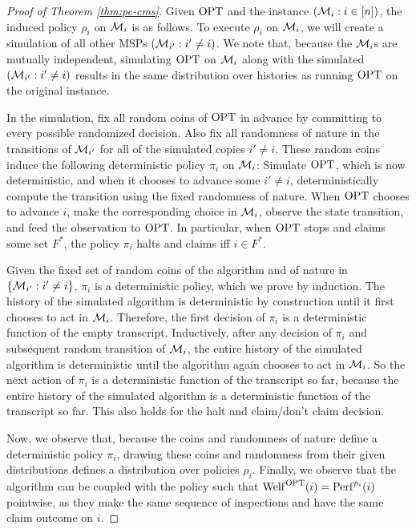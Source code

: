 \begin{proof}[Proof of Theorem \ref{thm:pc-cms}]
  Given $\mathrm{OPT}$ and the instance $(\mathcal{M}_i : i \in [n])$, the induced policy $\rho_i$ on $\mathcal{M}_i$ is as follows.
  To execute $\rho_i$ on $\mathcal{M}_i$, we will create a simulation of all other MSPs $(\mathcal{M}_{i'} : i' \neq i)$.
  We note that, because the $\mathcal{M}_i$s are mutually independent, simulating $\mathrm{OPT}$ on $\mathcal{M}_i$ along with the simulated $(\mathcal{M}_{i'} : i' \neq i)$ results in the same distribution over histories as running $\mathrm{OPT}$ on the original instance.

  In the simulation, fix all random coins of $\mathrm{OPT}$ in advance by committing to every possible randomized decision.
  Also fix all randomness of nature in the transitions of $\mathcal{M}_{i'}$ for all of the simulated copies $i' \neq i$.
  These random coins induce the following deterministic policy $\pi_i$ on $\mathcal{M}_i$:
  Simulate $\mathrm{OPT}$, which is now deterministic, and when it chooses to advance some $i' \neq i$, deterministically compute the transition using the fixed randomness of nature.
  When $\mathrm{OPT}$ chooses to advance $i$, make the corresponding choice in $\mathcal{M}_i$, observe the state transition, and feed the observation to $\mathrm{OPT}$.
  In particular, when $\mathrm{OPT}$ stops and claims some set $F^*$, the policy $\pi_i$ halts and claims iff $i \in F^*$.

  Given the fixed set of random coins of the algorithm and of nature in $\{\mathcal{M}_{i'} : i' \neq i\}$, $\pi_i$ is a deterministic policy, which we prove by induction.
  The history of the simulated algorithm is deterministic by construction until it first chooses to act in $\mathcal{M}_i$.
  Therefore, the first decision of $\pi_i$ is a deterministic function of the empty transcript.
  Inductively, after any decision of $\pi_i$ and subsequent random transition of $\mathcal{M}_i$, the entire history of the simulated algorithm is deterministic until the algorithm again chooses to act in $\mathcal{M}_i$.
  So the next action of $\pi_i$ is a deterministic function of the transcript so far, because the entire history of the simulated algorithm is a deterministic function of the transcript so far.
  This also holds for the halt and claim/don't claim decision.
	

  Now, we observe that, because the coins and randomness of nature define a deterministic policy $\pi_i$, drawing these coins and randomness from their given distributions defines a distribution over policies $\rho_i$.
  Finally, we observe that the algorithm can be coupled with the policy such that $\mathrm{Welf}^{\mathrm{OPT}}(i) = \mathrm{Perf}^{\rho_i}(i)$ pointwise, as they make the same sequence of inspections and have the same claim outcome on $i$.
\end{proof}



